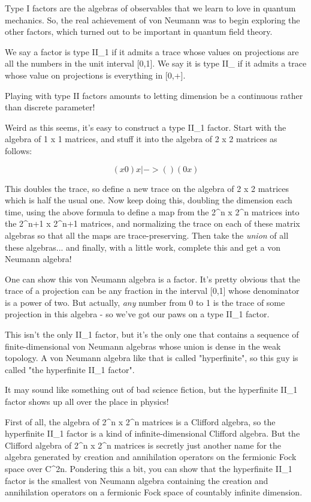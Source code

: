 Type I factors are the algebras of observables that we learn to love in
quantum mechanics.  So, the real achievement of von Neumann was to begin
exploring the other factors, which turned out to be important in quantum
field theory.

We say a factor is type II_{1} if it admits a trace
whose values on projections are all the numbers in the unit interval
[0,1].  We say it is type II_{\infty } if it admits
a trace whose value on projections is everything in [0,+\infty ].

Playing with type II factors amounts to letting dimension be a
continuous rather than discrete parameter!  


Weird as this seems, it's easy to construct a type II_{1}
factor.  Start with the algebra of 1 x 1 matrices, and stuff it into the
algebra of 2 x 2 matrices as follows:

$$
      ( x  0 ) 
x |-> (      )
      ( 0  x )
$$
    
This doubles the trace, so define a new trace on the algebra of 2 x 2
matrices which is half the usual one.  Now keep doing this, doubling the
dimension each time, using the above formula to define a map from the
2^{n} x 2^{n} matrices into the 2^{n+1} x
2^{n+1} matrices, and normalizing the trace on each of these
matrix algebras so that all the maps are trace-preserving.  Then take
the \emph{union} of all these algebras... and finally, with a little work,
complete this and get a von Neumann algebra!

One can show this von Neumann algebra is a factor.  It's pretty
obvious that the trace of a projection can be any fraction in the
interval [0,1] whose denominator is a power of two.  But actually, 
\emph{any} number from 0 to 1 is the trace of some projection in this
algebra - so we've got our paws on a type II_{1} factor.

This isn't the only II_{1} factor, but it's the only one that
contains a sequence of finite-dimensional von Neumann algebras whose
union is dense in the weak topology.  A von Neumann algebra like that is
called "hyperfinite", so this guy is called "the
hyperfinite II_{1} factor".

It may sound like something out of bad science fiction, but the
hyperfinite II_{1} factor shows up all over the place in physics!

First of all, the algebra of 2^{n} x 2^{n} matrices is a
Clifford algebra, so the hyperfinite II_{1} factor is a kind of
infinite-dimensional Clifford algebra.  But the Clifford algebra of
2^{n} x 2^{n} matrices is secretly just another name for
the algebra generated by creation and annihilation operators on the
fermionic Fock space over C^{2n}.  Pondering this a bit, you can show
that the hyperfinite II_{1} factor is the smallest von Neumann
algebra containing the creation and annihilation operators on a
fermionic Fock space of countably infinite dimension.

